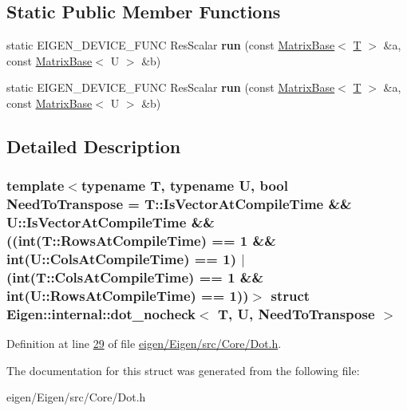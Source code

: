 \subsection*{Static Public Member Functions}
\begin{DoxyCompactItemize}
\item 
\mbox{\label{struct_eigen_1_1internal_1_1dot__nocheck_a935ef82de35699e02023fa0d85502581}} 
static E\+I\+G\+E\+N\+\_\+\+D\+E\+V\+I\+C\+E\+\_\+\+F\+U\+NC Res\+Scalar {\bfseries run} (const \hyperlink{group___core___module_class_eigen_1_1_matrix_base}{Matrix\+Base}$<$ \hyperlink{group___sparse_core___module}{T} $>$ \&a, const \hyperlink{group___core___module_class_eigen_1_1_matrix_base}{Matrix\+Base}$<$ U $>$ \&b)
\item 
\mbox{\label{struct_eigen_1_1internal_1_1dot__nocheck_a935ef82de35699e02023fa0d85502581}} 
static E\+I\+G\+E\+N\+\_\+\+D\+E\+V\+I\+C\+E\+\_\+\+F\+U\+NC Res\+Scalar {\bfseries run} (const \hyperlink{group___core___module_class_eigen_1_1_matrix_base}{Matrix\+Base}$<$ \hyperlink{group___sparse_core___module}{T} $>$ \&a, const \hyperlink{group___core___module_class_eigen_1_1_matrix_base}{Matrix\+Base}$<$ U $>$ \&b)
\end{DoxyCompactItemize}


\subsection{Detailed Description}
\subsubsection*{template$<$typename T, typename U, bool Need\+To\+Transpose = T\+::\+Is\+Vector\+At\+Compile\+Time \&\& U\+::\+Is\+Vector\+At\+Compile\+Time \&\& ((int(\+T\+::\+Rows\+At\+Compile\+Time) == 1 \&\& int(\+U\+::\+Cols\+At\+Compile\+Time) == 1)                      $\vert$                                               (int(\+T\+::\+Cols\+At\+Compile\+Time) == 1 \&\& int(\+U\+::\+Rows\+At\+Compile\+Time) == 1))$>$\newline
struct Eigen\+::internal\+::dot\+\_\+nocheck$<$ T, U, Need\+To\+Transpose $>$}



Definition at line \hyperlink{eigen_2_eigen_2src_2_core_2_dot_8h_source_l00029}{29} of file \hyperlink{eigen_2_eigen_2src_2_core_2_dot_8h_source}{eigen/\+Eigen/src/\+Core/\+Dot.\+h}.



The documentation for this struct was generated from the following file\+:\begin{DoxyCompactItemize}
\item 
eigen/\+Eigen/src/\+Core/\+Dot.\+h\end{DoxyCompactItemize}
